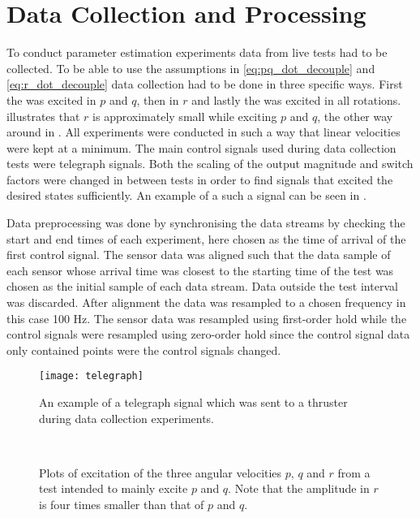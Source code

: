 \section{Data Collection and Processing} 
To conduct parameter estimation experiments data from live tests had to be collected. To be able to use the assumptions in \eqref{eq:pq_dot_decouple} and \eqref{eq:r_dot_decouple} data collection had to be done in three specific ways.
First the \abbrROV was excited in $p$ and $q$, then in $r$ and lastly the \abbrROV was excited in all rotations.  illustrates that $r$ is approximately small while exciting $p$ and $q$, the other way around in . All experiments were conducted in such a way that linear velocities were kept at a minimum.
The main control signals used during data collection tests were telegraph signals. Both the scaling of the output magnitude and switch factors were changed in between tests in order to find signals that excited the desired states sufficiently. An example of a such a signal can be seen in .

Data preprocessing was done by synchronising the data streams by checking the start and end times of each experiment, here chosen as the time of arrival of the first control signal. The sensor data was aligned such that the data sample of each sensor whose arrival time was closest to the starting time of the test was chosen as the initial sample of each data stream. Data outside the test interval was discarded. After alignment the data was resampled to a chosen frequency in this case 100 Hz. The sensor data was resampled using first-order hold while the control signals were resampled using zero-order hold since the control signal data only contained points were the control signals changed.  

\begin{figure}[htbp]
\centering
\texttt{[image: telegraph]}
\caption{An example of a telegraph signal which was sent to a thruster during data collection experiments.}
\label{fig:telegraph}
\end{figure}

\begin{figure}[htbp]
  \centering
  \qquad
  \\
  \caption{\label{fig:pqTest}%
 Plots of excitation of the three angular velocities $p$, $q$ and $r$ from a test intended to mainly excite $p$ and $q$. Note that the amplitude in $r$ is four times smaller than that of $p$ and $q$.}
\end{figure}

